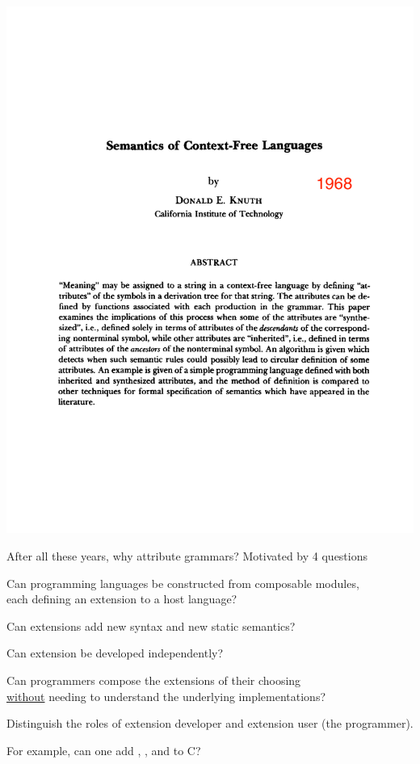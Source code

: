 \documentclass[11pt,aspectratio=169]{beamer}
\begin{document}
\begin{frame}%
\includegraphics[width=0.95\linewidth,trim={0 0 0 7cm},clip]{Knuth-Page-1-with-date.pdf}
\end{frame}


\begin{frame}{After all these years, why attribute grammars?}
\pause
Motivated by 4 questions

\bigskip\pause
\bes{0.3cm}
\x Can programming languages be constructed from composable modules, \\
   each defining an extension to a host language?

\pause
\x Can extensions add new syntax and new static semantics?

\pause
\x Can extension be developed independently?

\pause
\x Can programmers compose the extensions of their choosing \\
   \underline{without} needing to understand the underlying
   implementations?

   \bigskip
   Distinguish the roles of extension developer and extension user
   (the programmer).

   \pause
   \bigskip
   For example, can one add , ,
   and  to C?
\ee

\end{frame}
\end{document}
